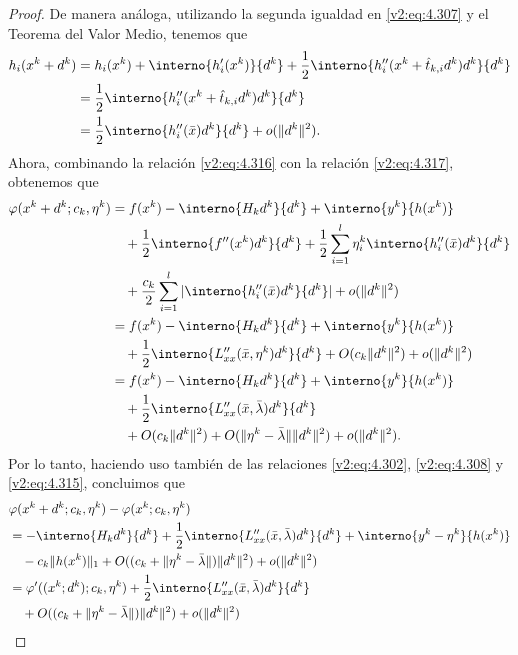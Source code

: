 \begin{proof}
De manera análoga, utilizando la segunda igualdad en \eqref{v2:eq:4.307} y el Teorema del Valor Medio, tenemos que
\begin{align}
h_i(x^k + d^k) &= h_i(x^k) + \interno{h'_i(x^k)}{d^k} + \frac{1}{2}\interno{h''_i(x^k + \hat{t}_{k,i} d^k)d^k}{d^k} \nonumber \\
&= \frac{1}{2}\interno{h''_i(x^k + \hat{t}_{k,i} d^k)d^k}{d^k} \nonumber \\
&= \frac{1}{2}\interno{h''_i(\bar{x})d^k}{d^k} + o(\|d^k\|^2).
\label{v2:eq:4.317}
\end{align}
Ahora, combinando la relación \eqref{v2:eq:4.316} con la relación \eqref{v2:eq:4.317}, obtenemos que
\begin{align*}
\varphi(x^k + d^k; c_k, \eta^k) &= f(x^k) - \interno{H_k d^k}{d^k} + \interno{y^k}{h(x^k)} \\
&\quad + \frac{1}{2} \interno{f''(x^k)d^k}{d^k} + \frac{1}{2} \sum_{i=1}^l \eta_i^k \interno{h''_i(\bar{x})d^k}{d^k} \\
&\quad + \frac{c_k}{2} \sum_{i=1}^l |\interno{h''_i(\bar{x})d^k}{d^k}| + o(\|d^k\|^2) \\
&= f(x^k) - \interno{H_k d^k}{d^k} + \interno{y^k}{h(x^k)} \\
&\quad + \frac{1}{2} \interno{L''_{xx}(\bar{x}, \eta^k)d^k}{d^k} + O(c_k \|d^k\|^2) + o(\|d^k\|^2) \\
&= f(x^k) - \interno{H_k d^k}{d^k} + \interno{y^k}{h(x^k)} \\
&\quad + \frac{1}{2} \interno{L''_{xx}(\bar{x}, \bar{\lambda})d^k}{d^k} \\
&\quad + O(c_k \|d^k\|^2) + O(\|\eta^k - \bar{\lambda}\|\|d^k\|^2) + o(\|d^k\|^2).
\end{align*}
Por lo tanto, haciendo uso también de las relaciones \eqref{v2:eq:4.302}, \eqref{v2:eq:4.308} y \eqref{v2:eq:4.315}, concluimos que
\begin{align*}
&\varphi(x^k + d^k; c_k, \eta^k) - \varphi(x^k; c_k, \eta^k) \\
&= -\interno{H_k d^k}{d^k} + \frac{1}{2} \interno{L''_{xx}(\bar{x}, \bar{\lambda})d^k}{d^k} + \interno{y^k - \eta^k}{h(x^k)} \\
&\quad - c_k \|h(x^k)\|_1 + O((c_k + \|\eta^k - \bar{\lambda}\|)\|d^k\|^2) + o(\|d^k\|^2) \\
&= \varphi'((x^k; d^k); c_k, \eta^k) + \frac{1}{2} \interno{L''_{xx}(\bar{x}, \bar{\lambda})d^k}{d^k} \\
&\quad + O((c_k + \|\eta^k - \bar{\lambda}\|)\|d^k\|^2) + o(\|d^k\|^2) \\

\end{align*}
\end{proof}
